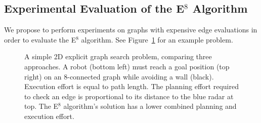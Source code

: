 \subsection{Experimental Evaluation of the E$^8$ Algorithm}

We propose to perform experiments on graphs with
expensive edge evaluations
in order to evaluate the E$^8$ algorithm.
See Figure~\ref{fig:e8-results} for an example problem.

\begin{figure}[t]
   \centering
   
   
   
   
   \quad
   \subfloat[][A$^*$ search.\\
         Planning Effort: 692.3 \\ %
         Execution Effort: 14.2 %
   ]{
      \texttt{[image: build/e8-world-astar]}
   }
   \vspace{0.05in}
   \subfloat[][Weighted A$^*$ search, $\epsilon=3$\\
         Planning Effort: 390.8 \\%
         Execution Effort: 18.5 %
   ]{
      \texttt{[image: build/e8-world-wastar]}
   }
   \quad
   \subfloat[][E$^8$ search, $\lambda=0.5$\\
         Planning Effort: 358.8 \\%
         Execution Effort: 20.5 %
   ]{
      \texttt{[image: build/e8-world-e8]}
   }
   
   \caption{A simple 2D explicit graph search problem,
      comparing three approaches.
      A robot (bottom left) must reach a goal position (top right)
      on an 8-connected graph
      while avoiding a wall (black).
      Execution effort is equal to path length.
      The planning effort required to check an edge is proportional
      to its distance to the blue radar at top.
      The E$^8$ algorithm's solution has a lower combined
      planning and execution effort.}
   \label{fig:e8-results}
\end{figure}

